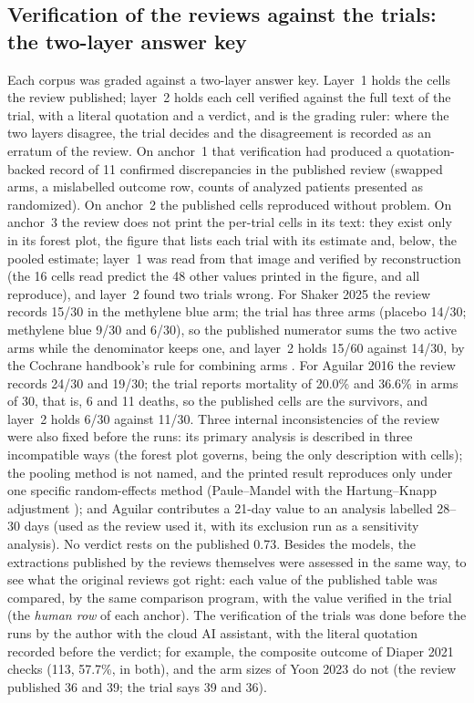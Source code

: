 \documentclass[11pt]{article}
\begin{document}
\subsection{Verification of the reviews against the trials: the two-layer answer key}
\label{sec:key}
Each corpus was graded against a two-layer answer key. Layer~1 holds the cells the review published; layer~2 holds each cell verified against the full text of the trial, with a literal quotation and a verdict, and is the grading ruler: where the two layers disagree, the trial decides and the disagreement is recorded as an erratum of the review. On anchor~1 that verification had produced a quotation-backed record of 11 confirmed discrepancies in the published review (swapped arms, a mislabelled outcome row, counts of analyzed patients presented as randomized). On anchor~2 the published cells reproduced without problem. On anchor~3 the review does not print the per-trial cells in its text: they exist only in its forest plot, the figure that lists each trial with its estimate and, below, the pooled estimate; layer~1 was read from that image and verified by reconstruction (the 16 cells read predict the 48 other values printed in the figure, and all reproduce), and layer~2 found two trials wrong. For Shaker 2025 the review records 15/30 in the methylene blue arm; the trial has three arms (placebo 14/30; methylene blue 9/30 and 6/30), so the published numerator sums the two active arms while the denominator keeps one, and layer~2 holds 15/60 against 14/30, by the Cochrane handbook's rule for combining arms \citep{higgins2023handbook}. For Aguilar 2016 the review records 24/30 and 19/30; the trial reports mortality of 20.0\% and 36.6\% in arms of 30, that is, 6 and 11 deaths, so the published cells are the survivors, and layer~2 holds 6/30 against 11/30. Three internal inconsistencies of the review were also fixed before the runs: its primary analysis is described in three incompatible ways (the forest plot governs, being the only description with cells); the pooling method is not named, and the printed result reproduces only under one specific random-effects method (Paule--Mandel with the Hartung--Knapp adjustment \citep{veroniki2016tau,inthout2014hksj}); and Aguilar contributes a 21-day value to an analysis labelled 28--30 days (used as the review used it, with its exclusion run as a sensitivity analysis). No verdict rests on the published 0.73. Besides the models, the extractions published by the reviews themselves were assessed in the same way, to see what the original reviews got right: each value of the published table was compared, by the same comparison program, with the value verified in the trial (the \emph{human row} of each anchor). The verification of the trials was done before the runs by the author with the cloud AI assistant, with the literal quotation recorded before the verdict; for example, the composite outcome of Diaper 2021 checks (113, 57.7\%, in both), and the arm sizes of Yoon 2023 do not (the review published 36 and 39; the trial says 39 and 36).
\end{document}
